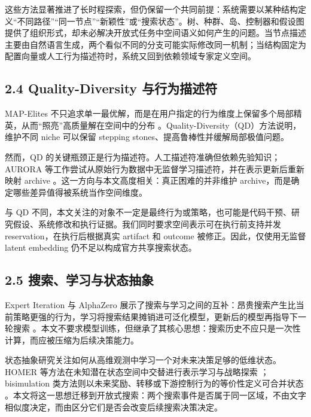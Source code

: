 \documentclass[
  11pt]{ctexart}
\begin{document}
这些方法显著推进了长时程探索，但仍保留一个共同前提：系统需要以某种结构定义``不同路径''``同一节点''``新颖性''或``搜索状态''。树、种群、岛、控制器和假设图提供了组织形式，却未必解决开放式任务中空间语义如何产生的问题。当节点描述主要由自然语言生成，两个看似不同的分支可能实际修改同一机制；当结构固定为配置向量或人工行为描述符时，系统又回到依赖领域专家定义空间。

\subsection{2.4 Quality-Diversity
与行为描述符}\label{quality-diversity-ux4e0eux884cux4e3aux63cfux8ff0ux7b26}

MAP-Elites
不只追求单一最优解，而是在用户指定的行为维度上保留多个局部精英，从而``照亮''高质量解在空间中的分布
\cite{mouret2015mapelites}。Quality-Diversity（QD）方法说明，维护不同
niche 可以保留 stepping stones、提高鲁棒性并缓解局部极值问题。

然而，QD 的关键瓶颈正是行为描述符。人工描述符准确但依赖先验知识；AURORA
等工作尝试从原始行为数据中无监督学习描述符，并在表示更新后重新映射
archive
\cite{cully2019aurora,grillotti2021unsupervisedqd}。这一方向与本文高度相关：真正困难的并非维护
archive，而是确定哪些差异值得被系统当作空间维度。

与 QD
不同，本文关注的对象不一定是最终行为或策略，也可能是代码干预、研究假设、系统修改和执行证据。我们同时要求空间表示可在执行前支持并发
reservation，在执行后根据真实 artifact 和 outcome
被修正。因此，仅使用无监督 latent embedding
仍不足以构成官方共享搜索状态。

\subsection{2.5
搜索、学习与状态抽象}\label{ux641cux7d22ux5b66ux4e60ux4e0eux72b6ux6001ux62bdux8c61}

Expert Iteration 与 AlphaZero
展示了搜索与学习之间的互补：昂贵搜索产生比当前策略更强的行为，学习将搜索结果摊销进可泛化模型，更新后的模型再指导下一轮搜索
\cite{anthony2017expertiteration,silver2018alphazero}。本文不要求模型训练，但继承了其核心思想：搜索历史不应只是一次性计算，而应被压缩为后续决策能力。

状态抽象研究关注如何从高维观测中学习一个对未来决策足够的低维状态。HOMER
等方法在未知潜在状态空间中交替进行表示学习与战略探索
\cite{misra2019homer}；bisimulation
类方法则以未来奖励、转移或下游控制行为的等价性定义可合并状态
\cite{hansenestruch2022bisimulation,zhang2021invariant}。本文将这一思想迁移到开放式搜索：两个搜索事件是否属于同一区域，不由文字相似度决定，而由区分它们是否会改变后续搜索决策决定。
\end{document}
